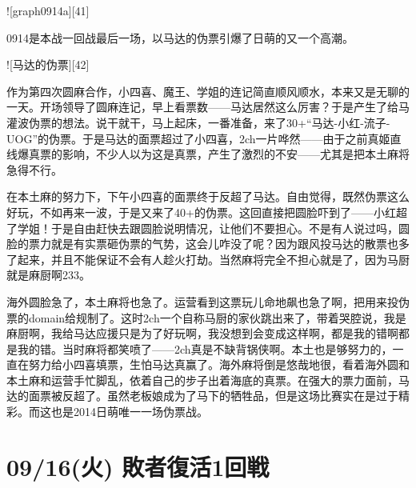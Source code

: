 ![graph0914a][41]

0914是本战一回战最后一场，以马达的伪票引爆了日萌的又一个高潮。

![马达的伪票][42]

作为第四次圆麻合作，小四喜、魔王、学姐的连记简直顺风顺水，本来又是无聊的一天。开场领导了圆麻连记，早上看票数——马达居然这么厉害？于是产生了给马灌波伪票的想法。说干就干，马上起床，一番准备，来了30+“马达-小红-流子-UOG”的伪票。于是马达的面票超过了小四喜，2ch一片哗然——由于之前真姬直线爆真票的影响，不少人以为这是真票，产生了激烈的不安——尤其是把本土麻将急得不行。

在本土麻的努力下，下午小四喜的面票终于反超了马达。自由觉得，既然伪票这么好玩，不如再来一波，于是又来了40+的伪票。这回直接把圆脸吓到了——小红超了学姐！于是自由赶快去跟圆脸说明情况，让他们不要担心。不是有人说过吗，圆脸的票力就是有实票砸伪票的气势，这会儿咋没了呢？因为跟风投马达的散票也多了起来，并且不能保证不会有人趁火打劫。当然麻将完全不担心就是了，因为马厨就是麻厨啊233。

海外圆脸急了，本土麻将也急了。运营看到这票玩儿命地飙也急了啊，把用来投伪票的domain给规制了。这时2ch一个自称马厨的家伙跳出来了，带着哭腔说，我是麻厨啊，我给马达应援只是为了好玩啊，我没想到会变成这样啊，都是我的错啊都是我的错。当时麻将都笑喷了——2ch真是不缺背锅侠啊。本土也是够努力的，一直在努力给小四喜填票，生怕马达真赢了。海外麻将倒是悠哉地很，看着海外圆和本土麻和运营手忙脚乱，依着自己的步子出着海底的真票。在强大的票力面前，马达的面票被反超了。虽然老板娘成为了马下的牺牲品，但是这场比赛实在是过于精彩。而这也是2014日萌唯一一场伪票战。

\section{09/16(火) 敗者復活1回戦}

